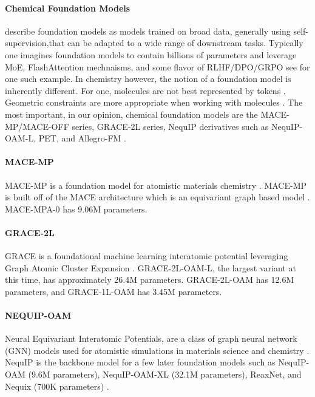 \documentclass[10pt]{article}
\begin{document}
\paragraph{Chemical Foundation Models}
\citet{foundationmodels} describe foundation models as  models trained on broad data, generally using self-supervision,that can be adapted to a wide range of downstream tasks. Typically one imagines foundation models to contain billions of parameters and leverage MoE, FlashAttention mechnaisms, and some flavor of RLHF/DPO/GRPO see \citet{deepseekai2024deepseekv2strongeconomicalefficient} for one such example.
In chemistry however, the notion of a foundation model is inherently different. For one, molecules are not best represented by tokens \citep{guo2023graphbasedmolecularrepresentationlearning, khorana2024polyatomiccomplexestopologicallyinformedlearning, Krenn_2020, langer2022representations}. Geometric constraints are more appropriate when working with molecules \citep{NEQUIP, fu2023learning, musaelian2023learning, batatia2022mace,ALLEGRO-FM}. The most important, in our opinion, chemical foundation models are the MACE-MP/MACE-OFF series, GRACE-2L series, NequIP derivatives such as NequIP-OAM-L, PET, and Allegro-FM \citep{MACE-MP, GRACE-2L, NEQUIP,ALLEGRO-FM, PET}. 

\paragraph{MACE-MP} MACE-MP is a foundation model for atomistic materials chemistry \citep{MACE-MP}. MACE-MP is built off of the MACE architecture which is an equivariant graph based model \citep{batatia2022mace}. MACE-MPA-0 has 9.06M parameters.

\paragraph{GRACE-2L} GRACE is a foundational machine learning interatomic potential leveraging Graph Atomic Cluster Expansion \citep{GRACE-2L}. GRACE-2L-OAM-L, the largest variant at this time, has approximately 26.4M parameters. GRACE-2L-OAM has 12.6M parameters, and GRACE-1L-OAM has 3.45M parameters.

\paragraph{NEQUIP-OAM} Neural Equivariant Interatomic Potentials, are a class of graph neural network (GNN) models used for atomistic simulations in materials science and chemistry \citep{NEQUIP}. NequIP is the backbone model for a few later foundation models such as NequIP-OAM (9.6M parameters), NequIP-OAM-XL (32.1M parameters), ReaxNet, and Nequix (700K parameters) \citep{gao2025foundation,koker2025training}.
\end{document}
